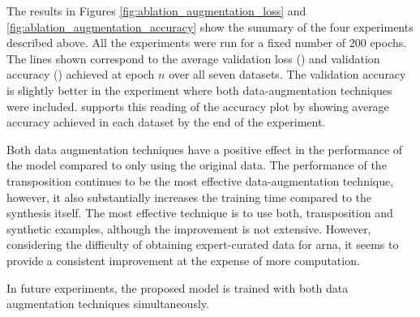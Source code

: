
The results in Figures \ref{fig:ablation_augmentation_loss}
and \ref{fig:ablation_augmentation_accuracy} show the
summary of the four experiments described above. All the
experiments were run for a fixed number of 200 epochs. The
lines shown correspond to the average validation loss
() and validation
accuracy () achieved
at epoch $n$ over all seven datasets. The validation
accuracy is slightly better in the experiment where both
data-augmentation techniques were included.
 supports this reading of the
accuracy plot by showing average accuracy achieved in each
dataset by the end of the experiment.




Both data augmentation techniques have a positive effect in
the performance of the model compared to only using the
original data. The performance of the transposition
continues to be the most effective data-augmentation
technique, however, it also substantially increases the
training time compared to the synthesis itself. The most
effective technique is to use both, transposition and
synthetic examples, although the improvement is not
extensive. However, considering the difficulty of obtaining
expert-curated data for \gls{arna}, it seems to provide a
consistent improvement at the expense of more computation.

In future experiments, the proposed model is trained with
both data augmentation techniques simultaneously.

